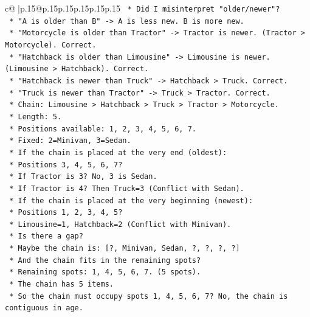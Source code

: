 \documentclass{article}
\begin{document}
{\begin{supertabular}{c@{$\;$}|p{.15\linewidth}@{}p{.15\linewidth}p{.15\linewidth}p{.15\linewidth}p{.15\linewidth}p{.15\linewidth}}
{{{\texttt{        *   Did I misinterpret "older/newer"?} \\
\texttt{            *   "A is older than B" {-}> A is less new. B is more new.} \\
\texttt{            *   "Motorcycle is older than Tractor" {-}> Tractor is newer. (Tractor > Motorcycle). Correct.} \\
\texttt{            *   "Hatchback is older than Limousine" {-}> Limousine is newer. (Limousine > Hatchback). Correct.} \\
\texttt{            *   "Hatchback is newer than Truck" {-}> Hatchback > Truck. Correct.} \\
\texttt{            *   "Truck is newer than Tractor" {-}> Truck > Tractor. Correct.} \\
\texttt{            *   Chain: Limousine > Hatchback > Truck > Tractor > Motorcycle.} \\
\texttt{            *   Length: 5.} \\
\texttt{            *   Positions available: 1, 2, 3, 4, 5, 6, 7.} \\
\texttt{            *   Fixed: 2=Minivan, 3=Sedan.} \\
\texttt{            *   If the chain is placed at the very end (oldest):} \\
\texttt{                *   Positions 3, 4, 5, 6, 7?} \\
\texttt{                *   If Tractor is 3? No, 3 is Sedan.} \\
\texttt{                *   If Tractor is 4? Then Truck=3 (Conflict with Sedan).} \\
\texttt{            *   If the chain is placed at the very beginning (newest):} \\
\texttt{                *   Positions 1, 2, 3, 4, 5?} \\
\texttt{                *   Limousine=1, Hatchback=2 (Conflict with Minivan).} \\
\texttt{            *   Is there a gap?} \\
\texttt{                *   Maybe the chain is: {[}?, Minivan, Sedan, ?, ?, ?, ?{]}} \\
\texttt{                *   And the chain fits in the remaining spots?} \\
\texttt{                *   Remaining spots: 1, 4, 5, 6, 7. (5 spots).} \\
\texttt{                *   The chain has 5 items.} \\
\texttt{                *   So the chain must occupy spots 1, 4, 5, 6, 7? No, the chain is contiguous in age.} \\
}}}
\end{supertabular}}
\end{document}
